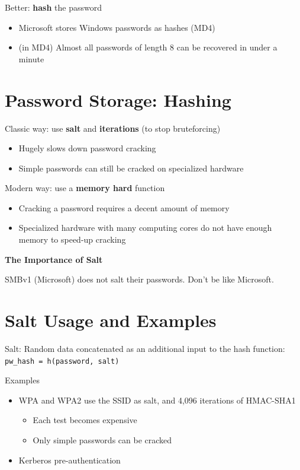 \documentclass[11pt]{article}
\begin{document}
Better: \textbf{hash} the password
\begin{itemize}
	\item Microsoft stores Windows passwords as hashes (MD4)
	\item (in MD4) Almost all passwords of length 8 can be recovered in under a minute
\end{itemize}

\section*{Password Storage: Hashing}

Classic way: use \textbf{salt} and \textbf{iterations} (to stop bruteforcing)
\begin{itemize}
	\item Hugely slows down password cracking
	\item Simple passwords can still be cracked on specialized hardware
\end{itemize}

Modern way: use a \textbf{memory hard} function

\begin{itemize}
	\item Cracking a password requires a decent amount of memory
	\item Specialized hardware with many computing cores do not have enough memory to speed-up cracking
\end{itemize}

\vspace{0.5cm}
\begin{center}
  {\LARGE \textbf{The Importance of Salt}}
\end{center}

SMBv1 (Microsoft) does not salt their passwords. Don't be like Microsoft.
\vspace{0.5cm}
\section*{Salt Usage and Examples}

Salt: Random data concatenated as an additional input to the hash function: \verb|pw_hash = h(password, salt)|

Examples
\begin{itemize}
	\item WPA and WPA2 use the SSID as salt, and 4,096 iterations of HMAC-SHA1
		\begin{itemize}
			\item Each test becomes expensive
			\item Only simple passwords can be cracked
		\end{itemize}
	\item Kerberos pre-authentication
\end{itemize}
\end{document}
